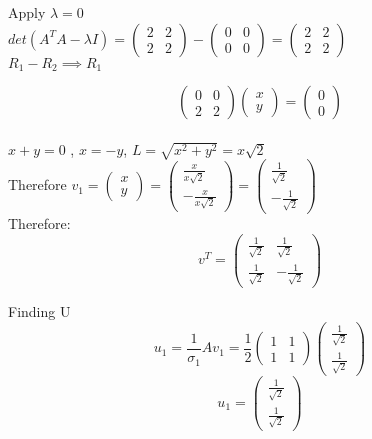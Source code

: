 \documentclass[12pt, oneside]{article}   	%
\begin{document}
\begin{enumerate}
	Apply $\lambda= 0$\\
	
	$det(A^TA- \lambda I)= \left( \begin{array}{cc} 2 & 2 \\ 2 & 2  \end{array} \right)- \left( \begin{array}{cc} 0 & 0 \\ 0 & 0  \end{array} \right) =\left( \begin{array}{cc} 2 & 2 \\ 2 & 2  \end{array} \right)$\\
	
	$R_1 - R_2 \implies R_1$
	
	
	$$\left( \begin{array}{cc} 0 & 0 \\ 2 & 2  \end{array} \right) \left( \begin{array}{c} x \\ y \end{array} \right) =\left( \begin{array}{c} 0 \\ 0  \end{array} \right)$$ \\
	
	$x+y=0$ , $x=-y$, $L=\sqrt{x^2+y^2}= x\sqrt{2}$\\ 
	Therefore $v_1= \left( \begin{array}{c} x \\ y  \end{array} \right)=\left( \begin{array}{c} \frac{x}{x\sqrt{2}} \\ -\frac{x}{x\sqrt{2}} \end{array} \right) = \left( \begin{array}{c} \frac{1}{\sqrt{2}} \\ -\frac{1}{\sqrt{2}} \end{array} \right)$\\
	Therefore: $$v^T=\left( \begin{array}{cc} \frac{1}{\sqrt{2}}& \frac{1}{\sqrt{2}} \\  \frac{1}{\sqrt{2}} & -\frac{1}{\sqrt{2}}   \end{array} \right)$$
	
	Finding U
	$$u_1= \frac{1}{\sigma_1}Av_1= \frac{1}{2}\left( \begin{array}{cc} 1&1 \\ 1& 1 \end{array} \right) \left( \begin{array}{c} \frac{1}{\sqrt{2}} \\ \frac{1}{\sqrt{2}}  \end{array} \right)$$
	$$u_1= \left( \begin{array}{c}  \frac{1}{\sqrt{2}}\\  \frac{1}{\sqrt{2}} \end{array} \right)$$\\
	

\end{enumerate}
\end{document}

